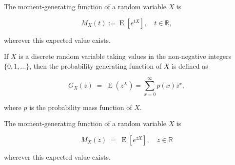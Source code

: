 \begin{framed}
The moment-generating function of a random variable $X$ is

\[ {\displaystyle M_{X}(t):=\operatorname {E} \left[e^{tX}\right],\quad t\in \mathbb {R} ,} \]

wherever this expected value exists.
\end{framed}





\begin{framed}
    
\noindent If $X$ is a discrete random variable taking values in the non-negative integers $\{0,1, \ldots\}$, then the probability generating function of $X$ is defined as 

\[ {\displaystyle G_{X}(z)\;=\;\operatorname{E} (z^{X})=\sum _{x=0}^{\infty }p(x)z^{x},}\]

\noindent where $p$ is the probability mass function of $X$. 
\end{framed}

\begin{framed}
\noindent The moment-generating function of a random variable $X$ is

\[ {\displaystyle M_{X}(z) \; = \; \operatorname{E} \left[ e^{zX}\right],\quad z \in \mathbb{R} } \]

\noindent wherever this expected value exists.
\end{framed}



